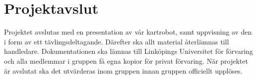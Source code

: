 \documentclass[a4paper,11pt]{article}
\begin{document}
\section{Projektavslut}
Projektet avslutas med en presentation av vår kartrobot, samt uppvisning av den i form av ett tävlingsdeltagande. Därefter ska allt material återlämnas till handledare. Dokumentationen ska lämnas till Linköpings Universitet för förvaring och alla medlemmar i gruppen få egna kopior för privat förvaring. När projektet är avslutat ska det utvärderas inom gruppen innan gruppen officiellt upplöses.

\begin{appendices}
\end{appendices}
\clearpage
{}	%
\printbibliography
\end{document}
